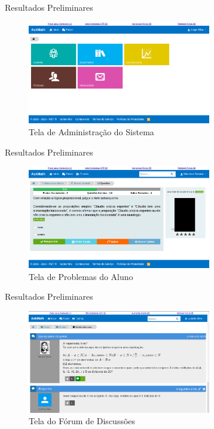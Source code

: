 \documentclass[aspectratio=169]{beamer}
\begin{document}
\begin{frame}{Resultados Preliminares}
	\begin{figure}[H]
	\centering
	\caption{Tela de Administra\c{c}\~ao do Sistema}
	\includegraphics[width=8cm]{figuras/askmath/2.png}
	\end{figure}
\end{frame}

\begin{frame}{Resultados Preliminares}
	\begin{figure}[H]
	\centering
	\caption{Tela de Problemas do Aluno}
	\includegraphics[width=8cm]{figuras/askmath/3.png}
	\end{figure}
\end{frame}

\begin{frame}{Resultados Preliminares}
	\begin{figure}[H]
	\centering
	\caption{Tela do F\'orum de Discuss\~oes}
	\includegraphics[width=8cm]{figuras/askmath/4.png}
	\end{figure}
\end{frame}
\end{document}
